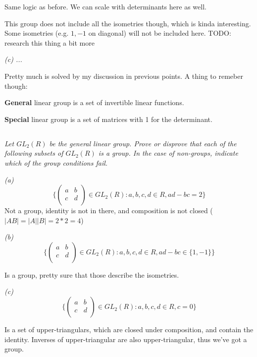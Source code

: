 \documentclass[11pt,oneside,titlepage]{book}
\newcommand{\set}[1]{\{ #1 \}}
\begin{document}
Same logic as before. We can scale with determinants here as well.

This group does not include all the isometries though, which is kinda
interesting.  Some isometries (e.g. $1, -1$ on diagonal) will not be
included here. TODO: research this thing a bit more

\textit{(c) ... }

Pretty much is solved by my discussion in previous points. A thing to remeber though:

\textbf{General} linear group is a set of invertible linear functions.

\textbf{Special} linear group is a set of matrices with 1 for the
determinant.

\subsection{}

\textit{Let $GL_2(R)$ be the general linear group. Prove or disprove
  that each of the following subsets of $GL_2(R)$ is a group. In the
  case of non-groups, indicate which of the group conditions fail.
}

\textit{(a)
  $$\set{
  \begin{pmatrix}
    a & b \\
    c & d \\
  \end{pmatrix} \in GL_2(R): a, b, c, d \in R, ad - bc = 2}
  $$
}
Not a group, identity is not in there, and composition is not closed ($|A B | = |A| |B| = 2 * 2 = 4$)

\textit{(b)
  $$\set{
  \begin{pmatrix}
    a & b \\
    c & d \\
  \end{pmatrix} \in GL_2(R): a, b, c, d \in R, ad - bc \in \set{1, -1}}
  $$
}

Is a group, pretty sure that those describe the isometries. 

\textit{(c)
  $$\set{
  \begin{pmatrix}
    a & b \\
    c & d \\
  \end{pmatrix} \in GL_2(R): a, b, c, d \in R, c = 0}
  $$
}

Is a set of upper-triangulars, which are closed under composition, and contain the identity.
Inverses of upper-triangular are also upper-triangular, thus we've got a group.
\end{document}
